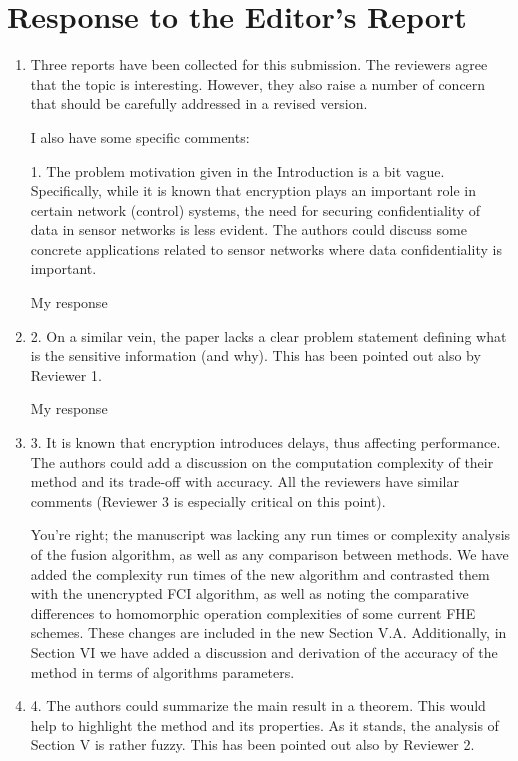 \documentclass[a4paper]{scrartcl}
\newenvironment{rebuttal}{\begin{enumerate}[label={\color{grey}\thesection.\arabic{enumi}},leftmargin=0pt,ref=\thesection.\arabic{enumi}]}{\end{enumerate}}
\newcommand{\reviewtext}[1]{{\color{nblue} #1}}
\begin{document}
\section*{Response to the Editor's Report}
\def\thesection{E}
\begin{rebuttal} %
\item \reviewtext{Three reports have been collected for this submission. The reviewers
agree that the topic is interesting. However, they also raise a number
of concern that should be carefully addressed in a revised version. 

I also have some specific comments:

1. The problem motivation given in the Introduction is a bit vague.
Specifically, while it is known that encryption plays an important role
in certain network (control) systems, the need for securing
confidentiality of data in sensor networks is less evident. The authors
could discuss some concrete applications related to sensor networks
where data confidentiality is important.}

My response

\item \reviewtext{2. On a similar vein, the paper lacks a clear problem statement
defining what is the sensitive information (and why). This has been
pointed out also by Reviewer 1.}

My response

\item \reviewtext{3. It is known that encryption introduces delays, thus affecting
performance. The authors could add a discussion on the computation
complexity of their method and its trade-off with accuracy. All the
reviewers have similar comments (Reviewer 3 is especially critical on
this point).}

You're right; the manuscript was lacking any run times or complexity analysis of the fusion algorithm, as well as any comparison between methods. We have added the complexity run times of the new algorithm and contrasted them with the unencrypted FCI algorithm, as well as noting the comparative differences to homomorphic operation complexities of some current FHE schemes. These changes are included in the new Section V.A. Additionally, in Section VI we have added a discussion and derivation of the accuracy of the method in terms of algorithms parameters.

\item \reviewtext{4. The authors could summarize the main result in a theorem. This would
help to highlight the method and its properties. As it stands, the
analysis of Section V is rather fuzzy. This has been pointed out also
by Reviewer 2.}


\end{rebuttal}
\end{document}
